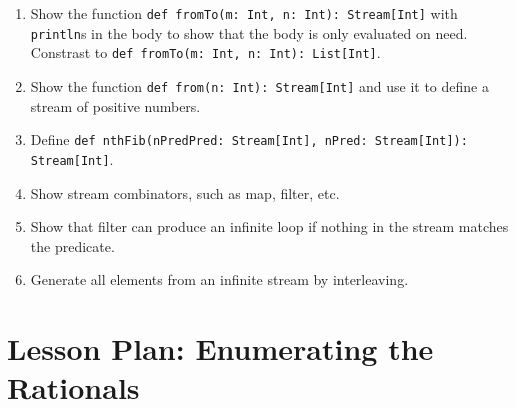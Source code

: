 \documentclass[9pt]{extbook}
\begin{document}
\begin{enumerate}

\item Show the function \lstinline|def fromTo(m: Int, n: Int): Stream[Int]|
  with \lstinline|println|s in the body to show that the body is only evaluated
  on need. Constrast to \lstinline|def fromTo(m: Int, n: Int): List[Int]|.

\item Show the function \lstinline|def from(n: Int): Stream[Int]| and use
  it to define a stream of positive numbers.

\item Define \lstinline|def nthFib(nPredPred: Stream[Int], nPred: Stream[Int]): Stream[Int]|.

\item Show stream combinators, such as map, filter, etc.

\item Show that filter can produce an infinite loop if nothing in the stream
  matches the predicate.

\item Generate all elements from an infinite stream by interleaving.

\end{enumerate}


\chapter{Lesson Plan: Enumerating the Rationals}
\end{document}
